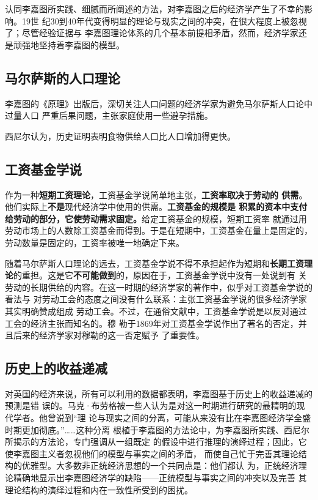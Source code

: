 认同李嘉图所实践、细腻而所阐述的方法，对李嘉图之后的经济学产生了不幸的影响。19世
纪30到40年代变得明显的理论与现实之间的冲突，在很大程度上被忽视了；尽管经验证据与
李嘉图理论体系的几个基本前提相矛盾，然而，经济学家还是顽强地坚持着李嘉图的模型。

\subsection{马尔萨斯的人口理论}

李嘉图的《原理》出版后，深切关注人口问题的经济学家为避免马尔萨斯人口论中过量人口
严重后果问题，主张家庭使用一些避孕措施。

西尼尔认为，历史证明表明食物供给人口比人口增加得更快。

\subsection{工资基金学说}

作为一种\textbf{短期工资理论}，工资基金学说简单地主张，\textbf{工资率取决于劳动的
  供需}。他们实际上\textbf{不是}现代经济学中使用的供需。\textbf{工资基金的规模是
  积累的资本中支付给劳动的部分，它使劳动需求固定。}给定工资基金的规模，短期工资率
就通过用劳动市场上的人数除工资基金而得到。于是在短期中，工资基金在量上是固定的，
劳动数量是固定的，工资率被唯一地确定下来。

随着马尔萨斯人口理论的远去，工资基金学说不得不承担起作为短期和\textbf{长期工资理
  论}的重担。这是它\textbf{不可能做到}的，原因在于，工资基金学说中没有一处说到有
关劳动的长期供给的内容。在这一时期的经济学家的著作中，似乎对工资基金学说的看法与
对劳动工会的态度之间没有什么联系：主张工资基金学说的很多经济学家其实明确赞成组成
劳动工会。不过，在通俗文献中，工资基金学说是以反对通过工会的经济主张而知名的。穆
勒于1869年对工资基金学说作出了著名的否定，并且后来的经济学家对穆勒的这一否定赋予
了重要性。

\subsection{历史上的收益递减}

对英国的经济来说，所有可以利用的数据都表明，李嘉图基于历史上的收益递减的预测是错
误的。马克·布劳格被一些人认为是对这一时期进行研究的最精明的现代学者。他曾说到“理
论与现实之间的分离，可能从来没有比在李嘉图经济学全盛时期更加彻底。”……这种分离
根植于李嘉图的方法论中，为李嘉图所实践、西尼尔所揭示的方法论，专门强调从一组既定
的假设中进行推理的演绎过程；因此，它使李嘉图主义者忽视他们的模型与事实之间的矛盾，
而使自己忙于完善其理论结构的优雅型。大多数非正统经济思想的一个共同点是：他们都认
为，正统经济理论精确地显示出李嘉图经济学的缺陷——正统模型与事实之间的冲突以及完善
其理论结构的演绎过程和内在一致性所受到的困扰。


